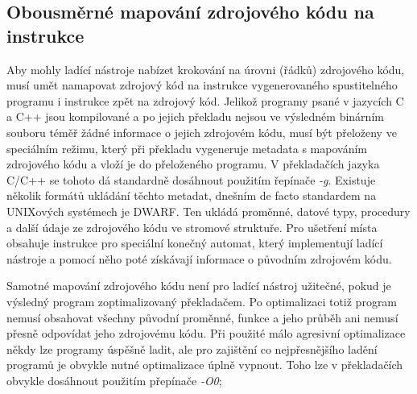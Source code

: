 \documentclass[bc,male,java,dept460]{diploma}						%
\begin{document}
	\subsection{Obousměrné mapování zdrojového kódu na instrukce}
		Aby mohly ladící nástroje nabízet krokování na úrovni (řádků) zdrojového kódu, musí umět namapovat zdrojový kód na instrukce vygenerovaného
		spustitelného programu i instrukce zpět na zdrojový kód. Jelikož programy psané v jazycích C a C++ jsou kompilované a po jejich překladu nejsou
		ve výsledném binárním souboru téměř žádné informace o jejich zdrojovém kódu, musí být přeloženy ve speciálním režimu, který při překladu vygeneruje
		metadata s mapováním zdrojového kódu a vloží je do přeloženého programu. V překladačích jazyka C/C++ se tohoto dá standardně dosáhnout použitím
		řepínače \emph{-g}. Existuje několik formátů ukládání těchto metadat, dnešním de facto standardem na UNIXových systémech je DWARF\cite{dwarf}.
		Ten ukládá proměnné, datové typy, procedury a další údaje ze zdrojového kódu ve stromové struktuře. Pro ušetření místa obsahuje instrukce pro
		speciální konečný automat, který implementují ladící nástroje a pomocí něho poté získávají informace o původním zdrojovém kódu.
		
		\vspace{5mm}
		
		\par Samotné mapování zdrojového kódu není pro ladící nástroj užitečné, pokud je výsledný program zoptimalizovaný překladačem. Po optimalizaci
		totiž program nemusí obsahovat všechny původní proměnné, funkce a jeho průběh ani nemusí přesně odpovídat jeho zdrojovému kódu. Při použité málo agresivní
		optimalizace někdy lze programy úspěšně ladit, ale pro zajištění co nejpřesnějšího ladění programů je obvykle nutné optimalizace úplně vypnout. Toho lze
		v překladačích obvykle dosáhnout použitím přepínače \emph{-O0};
	
\end{document}

